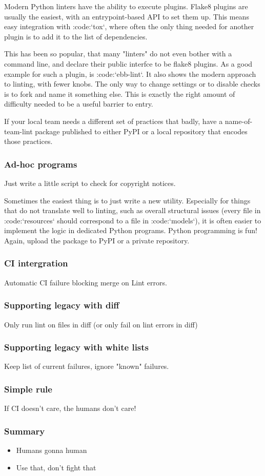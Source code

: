 Modern Python linters have the ability to execute plugins.
Flake8 plugins are usually the easiest,
with an entrypoint-based API to set them up.
This means easy integration with :code:`tox`,
where often the only thing needed for another plugin is to
add it to the list of dependencies.

This has been so popular,
that many "linters" do not even bother with
a command line,
and declare their public interfce to be flake8 plugins.
As a good example for such a plugin,
is :code:`ebb-lint`.
It also shows the modern approach to linting,
with fewer knobs.
The only way to change settings
or to disable checks is to fork
and name it something else.
This is exactly the right amount of difficulty
needed to be a useful barrier to entry.

If your local team needs a different set of practices that badly,
have a name-of-team-lint package published to either PyPI
or a local repository
that encodes those practices.

\begin{frame}
\frametitle{Ad-hoc programs}
Just write a little script to check for copyright notices.
\end{frame}

Sometimes the easiest thing is to just write a new utility.
Especially for things that do not translate well to linting,
such as overall structural issues
(every file in :code:`resources` should correspond to
a file in :code:`models`),
it is often easier to implement the logic in dedicated Python programs.
Python programming is fun!
Again, upload the package to PyPI or a private repository.

\begin{frame}
\frametitle{CI intergration}
Automatic CI failure blocking merge on Lint errors.
\end{frame}

\begin{frame}
\frametitle{Supporting legacy with diff}
Only run lint on files in diff
(or only fail on lint errors in diff)
\end{frame}

\begin{frame}
\frametitle{Supporting legacy with white lists}
Keep list of current failures,
ignore "known" failures.
\end{frame}

\begin{frame}
\frametitle{Simple rule}
If CI doesn't care,
the humans don't care!
\end{frame}

\begin{frame}
\frametitle{Summary}
\begin{itemize}
\item Humans gonna human
\item Use that, don't fight that
\end{itemize}
\end{frame}


